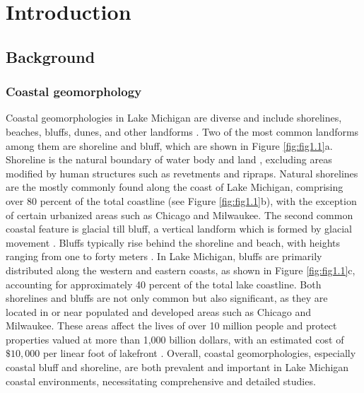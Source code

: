 \chapter{Introduction}
\label{ch:Introduction}

\section{Background}
\label{sec:Background}

\subsection{Coastal geomorphology}
\label{subsec:Coastal geomorphology}

Coastal geomorphologies in Lake Michigan are diverse and include shorelines,
beaches, bluffs, dunes, and other landforms \citep{jackson_coastal_2013}. Two of
the most common landforms among them are shoreline and bluff, which are shown in
Figure \ref{fig:fig1.1}a. Shoreline is the natural boundary of water body and
land \citep{del_rio_error_2013}, excluding areas modified by human structures
such as revetments and ripraps. Natural shorelines are the mostly commonly found
along the coast of Lake Michigan, comprising over 80 percent of the total
coastline (see Figure \ref{fig:fig1.1}b), with the exception of certain
urbanized areas such as Chicago and Milwaukee. The second common coastal feature
is glacial till bluff, a vertical landform which is formed by glacial movement
\citep{mickelson1977shoreline,mickelson2004erosion}. Bluffs typically rise
behind the shoreline and beach, with heights ranging from one to forty meters
\citep{mickelson2004erosion}. In Lake Michigan, bluffs are primarily distributed
along the western and eastern coasts, as shown in Figure \ref{fig:fig1.1}c,
accounting for approximately 40 percent of the total lake coastline. Both
shorelines and bluffs are not only common but also significant, as they are
located in or near populated and developed areas such as Chicago and Milwaukee.
These areas affect the lives of over 10 million people and protect properties
valued at more than 1,000 billion dollars, with an estimated cost of $ \$10,000$
per linear foot of lakefront \citep{folger_coastal_1996}. Overall, coastal
geomorphologies, especially coastal bluff and shoreline, are both prevalent and
important in Lake Michigan coastal environments, necessitating comprehensive and
detailed studies.
